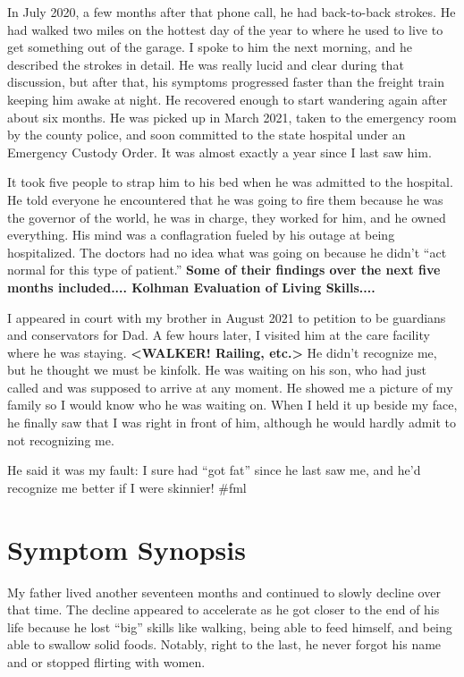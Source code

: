 \documentclass{article}
\begin{document}
In July 2020, a few months after that phone call, he had back-to-back strokes. He had walked two miles on the hottest day of the year to where he used to live to get something out of the garage. I spoke to him the next morning, and he described the strokes in detail. He was really lucid and clear during that discussion, but after that, his symptoms progressed faster than the freight train keeping him awake at night. He recovered enough to start wandering again after about six months. He was picked up in March 2021, taken to the emergency room by the county police, and soon committed to the state hospital under an Emergency Custody Order. It was almost exactly a year since I last saw him. 

It took five people to strap him to his bed when he was admitted to the hospital. He told everyone he encountered that he was going to fire them because he was the governor of the world, he was in charge, they worked for him, and he owned everything. His mind was a conflagration fueled by his outage at being hospitalized. The doctors had no idea what was going on because he didn't ``act normal for this type of patient.'' \textbf{Some of their findings over the next five months included.... Kolhman Evaluation of Living Skills....}

I appeared in court with my brother in August 2021 to petition to be guardians and conservators for Dad. A few hours later, I visited him at the care facility where he was staying. \textbf{<WALKER! Railing, etc.>} He didn't recognize me, but he thought we must be kinfolk. He was waiting on his son, who had just called and was supposed to arrive at any moment. He showed me a picture of my family so I would know who he was waiting on. When I held it up beside my face, he finally saw that I was right in front of him, although he would hardly admit to not recognizing me. 

He said it was my fault: I sure had ``got fat'' since he last saw me, and he'd recognize me better if I were skinnier! \#fml

\section*{Symptom Synopsis}

My father lived another seventeen months and continued to slowly decline over that time. The decline appeared to accelerate as he got closer to the end of his life because he lost ``big'' skills like walking, being able to feed himself, and being able to swallow solid foods. Notably, right to the last, he never forgot his name and or stopped flirting with women.
\end{document}
